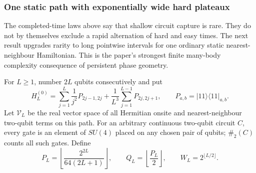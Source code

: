\subsubsection{One static path with exponentially wide hard plateaux}

The completed-time laws above say that shallow circuit capture is rare.  They
do not by themselves exclude a rapid alternation of hard and easy times.  The
next result upgrades rarity to long pointwise intervals for one ordinary
static nearest-neighbour Hamiltonian.  This is the paper's strongest finite
many-body complexity consequence of persistent phase geometry.

For $L\ge1$, number $2L$ qubits consecutively and put
\begin{equation}
 H_L^{(0)}=\sum_{j=1}^{L}\frac1{j^2}P_{2j-1,2j}
 +\frac1{L^3}\sum_{j=1}^{L-1}P_{2j,2j+1},
 \qquad P_{a,b}=|11\rangle\!\langle11|_{a,b}.        \label{eq:plateauseed}
\end{equation}
Let $\mathscr V_L$ be the real vector space of all Hermitian onsite and
nearest-neighbour two-qubit terms on this path.  For an arbitrary continuous
two-qubit circuit $C$, every gate is an element of $SU(4)$ placed on any
chosen pair of qubits; $\#_2(C)$ counts all such gates.  Define
\begin{equation}
 P_L=\left\lfloor\frac{2^{2L}}{64(2L+1)}\right\rfloor,
 \qquad Q_L=\left\lfloor\frac{P_L}{2}\right\rfloor,
 \qquad W_L=2^{\lfloor L/2\rfloor}.                 \label{eq:plateaubudgets}
\end{equation}

